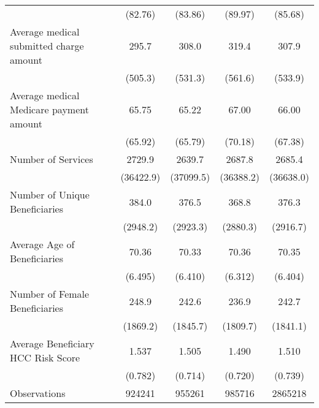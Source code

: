 \begin{adjustbox}{max
width={\textwidth},caption={Summary Statistics, Aggregate Table\label{table:aggregatesum}},nofloat=table}
\begin{tabular}{l*{4}{c}}
                    &     (82.76)         &     (83.86)         &     (89.97)         &     (85.68)         \\
\addlinespace
Average medical submitted charge amount&       295.7         &       308.0         &       319.4         &       307.9         \\
                    &     (505.3)         &     (531.3)         &     (561.6)         &     (533.9)         \\
\addlinespace
Average medical Medicare payment amount&       65.75         &       65.22         &       67.00         &       66.00         \\
                    &     (65.92)         &     (65.79)         &     (70.18)         &     (67.38)         \\
\addlinespace
Number of Services  &      2729.9         &      2639.7         &      2687.8         &      2685.4         \\
                    &   (36422.9)         &   (37099.5)         &   (36388.2)         &   (36638.0)         \\
\addlinespace
Number of Unique Beneficiaries&       384.0         &       376.5         &       368.8         &       376.3         \\
                    &    (2948.2)         &    (2923.3)         &    (2880.3)         &    (2916.7)         \\
\addlinespace
Average Age of Beneficiaries&       70.36         &       70.33         &       70.36         &       70.35         \\
                    &     (6.495)         &     (6.410)         &     (6.312)         &     (6.404)         \\
\addlinespace
Number of Female Beneficiaries&       248.9         &       242.6         &       236.9         &       242.7         \\
                    &    (1869.2)         &    (1845.7)         &    (1809.7)         &    (1841.1)         \\
\addlinespace
Average Beneficiary HCC Risk Score&       1.537         &       1.505         &       1.490         &       1.510         \\
                    &     (0.782)         &     (0.714)         &     (0.720)         &     (0.739)         \\
\midrule
Observations        &      924241         &      955261         &      985716         &     2865218         \\
\bottomrule
\end{tabular}\end{adjustbox}
